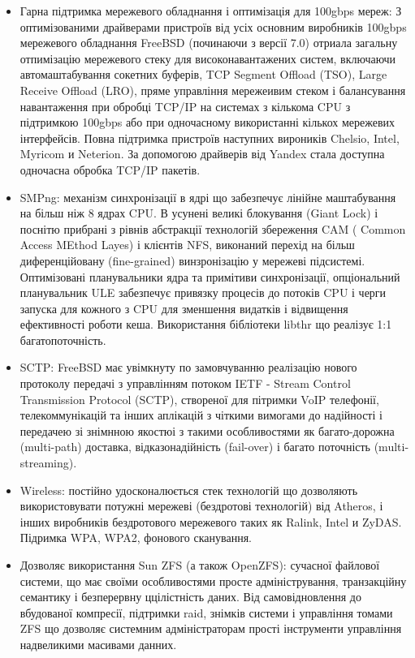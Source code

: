 \begin{itemize}

    \item Гарна підтримка мережевого обладнання і оптимізація для 100gbps мереж: З оптимізованими драйверами пристроїв  від усіх основним виробників 100gbps мережевого обладнання FreeBSD (починаючи з версії 7.0) отриала загальну отпимізацію мережевого стеку для високонавантажених систем, включаючи автомаштабування сокетних буферів, TCP Segment Offload (TSO), Large Receive Offload (LRO), пряме управління мережеивим стеком  і балансування навантаження при обробці TCP/IP на системах з кількома CPU з підтримкою 100gbps або при одночасному використанні кількох мережевих інтерфейсів. Повна підтримка пристроїв наступних вироників Chelsio, Intel, Myricom и Neterion. За допомогою драйверів від Yandex стала доступна одночасна обробка TCP/IP пакетів.

    \item SMPng: механізм синхронізації в ядрі що забезпечує лінійне маштабування на більш ніж 8 ядрах CPU. В усунені великі блокування (Giant Lock) і поснітю прибрані з рівнів абстракції технологій збереження CAM ( Common Access MEthod Layes) і клієнтів NFS, виконаний перехід на більш диференційовану (fine-grained) винзронізацію у мережеві підсистемі. Оптимізовані планувальники ядра та примітиви синхронізації, опціональний планувальник ULE забезпечує
    привязку процесів до потоків CPU і черги запуска для кожного з CPU для зменшення видатків і відвищення ефективності роботи кеша. Використання бібліотеки libthr що реалізує 1:1 багатопоточність.

    \item SCTP: FreeBSD має увімкнуту по замовчуванню реалізацію нового протоколу передачі з управлінням потоком IETF - Stream Control Transmission Protocol (SCTP), створеної для пітримки VoIP телефонії, телекоммунікацій та інших аплікацій з чіткими вимогами до надійності  і передачею зі знімнною якостюі з такими особливостями як багато-дорожна (multi-path) доставка, відказонадійність (fail-over) і багато поточність (multi-streaming).

    \item Wireless: постійно удосконалюється стек технологій що дозволяють використовувати потужні мережеві (бездротові технологій) від Atheros, і інших виробників бездротового мережевого  таких як Ralink, Intel и ZyDAS. Підримка WPA, WPA2, фонового сканування.

    \item Дозволяє використання Sun ZFS (а також OpenZFS): сучасної файлової системи, що має своїми особливостями просте адміністрування, транзакційну семантику і безперервну ццілістність даних. Від самовідновлення до вбудованої компресії, підтримки raid, знімків системи і управління томами ZFS що дозволяє системним адміністраторам прості інструменти управління надвеликими масивами данних.


\end{itemize}
